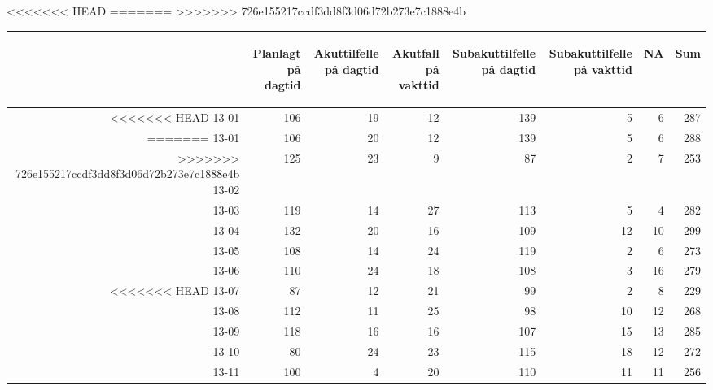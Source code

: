 \documentclass[presentation,xcolor=pdftex,dvipsnames,table]{beamer}
\begin{document}
\begin{frame}
\begin{tiny}
<<<<<<< HEAD
=======
>>>>>>> 726e155217ccdf3dd8f3d06d72b273e7c1888e4b
\begin{table}[ht]
\centering
\begin{tabular}{rrrrrrrr}
  \toprule
 & \begin{sideways} Planlagt på dagtid \end{sideways} & \begin{sideways} Akuttilfelle på dagtid \end{sideways} & \begin{sideways} Akutfall på vakttid \end{sideways} & \begin{sideways} Subakuttilfelle på dagtid \end{sideways} & \begin{sideways} Subakuttilfelle på vakttid \end{sideways} & \begin{sideways} NA \end{sideways} & \begin{sideways} Sum \end{sideways} \\ 
  \midrule
<<<<<<< HEAD
13-01 & 106 & 19 & 12 & 139 & 5 & 6 & 287 \\ 
=======
13-01 & 106 & 20 & 12 & 139 & 5 & 6 & 288 \\ 
>>>>>>> 726e155217ccdf3dd8f3d06d72b273e7c1888e4b
  13-02 & 125 & 23 & 9 & 87 & 2 & 7 & 253 \\ 
  13-03 & 119 & 14 & 27 & 113 & 5 & 4 & 282 \\ 
  13-04 & 132 & 20 & 16 & 109 & 12 & 10 & 299 \\ 
  13-05 & 108 & 14 & 24 & 119 & 2 & 6 & 273 \\ 
  13-06 & 110 & 24 & 18 & 108 & 3 & 16 & 279 \\ 
<<<<<<< HEAD
  13-07 & 87 & 12 & 21 & 99 & 2 & 8 & 229 \\ 
  13-08 & 112 & 11 & 25 & 98 & 10 & 12 & 268 \\ 
  13-09 & 118 & 16 & 16 & 107 & 15 & 13 & 285 \\ 
  13-10 & 80 & 24 & 23 & 115 & 18 & 12 & 272 \\ 
  13-11 & 100 & 4 & 20 & 110 & 11 & 11 & 256 \\ 

\end{tabular}
\end{table}
\end{tiny}
\end{frame}
\end{document}
